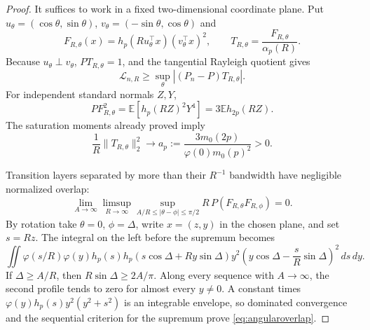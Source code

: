 \documentclass[11pt]{article}
\newcommand{\E}{\mathbb E}
\begin{document}
\begin{proof}
It suffices to work in a fixed two-dimensional coordinate plane.  Put
$u_\theta=(\cos\theta,\sin\theta)$, $v_\theta=(-\sin\theta,\cos\theta)$ and
\[
 F_{R,\theta}(x)=h_p(Ru_\theta^\top x)(v_\theta^\top x)^2,
 \qquad T_{R,\theta}=\frac{F_{R,\theta}}{\alpha_p(R)}.
\]
Because $u_\theta\perp v_\theta$, $PT_{R,\theta}=1$, and the tangential Rayleigh quotient gives
\begin{equation}
 \mathcal L_{n,R}\ge\sup_\theta|(P_n-P)T_{R,\theta}|.
 \label{eq:tangentialprocesslower}
\end{equation}
For independent standard normals $Z,Y$,
\[
 PF_{R,\theta}^2=\E[h_p(RZ)^2Y^4]=3\E h_{2p}(RZ).
\]
The saturation moments already proved imply
\begin{equation}
 \frac1R\lVert T_{R,\theta}\rVert_2^2\longrightarrow
 a_p:=\frac{3m_0(2p)}{\varphi(0)m_0(p)^2}>0.
 \label{eq:angularprocessvariance}
\end{equation}

Transition layers separated by more than their $R^{-1}$ bandwidth have negligible normalized overlap:
\begin{equation}
 \lim_{A\to\infty}\limsup_{R\to\infty}
 \sup_{A/R\le|\theta-\phi|\le\pi/2}R\,P(F_{R,\theta}F_{R,\phi})=0.
 \label{eq:angularoverlap}
\end{equation}
By rotation take $\theta=0$, $\phi=\Delta$, write $x=(z,y)$ in the chosen plane, and set $s=Rz$.  The integral
on the left before the supremum becomes
\[
 \iint\varphi(s/R)\varphi(y)h_p(s)h_p(s\cos\Delta+Ry\sin\Delta)y^2
 \left(y\cos\Delta-\frac{s}{R}\sin\Delta\right)^2\,ds\,dy.
\]
If $\Delta\ge A/R$, then $R\sin\Delta\ge2A/\pi$.  Along every sequence with $A\to\infty$, the second profile
tends to zero for almost every $y\ne0$.  A constant times
$\varphi(y)h_p(s)y^2(y^2+s^2)$ is an integrable envelope, so dominated convergence and the sequential criterion
for the supremum prove \eqref{eq:angularoverlap}.


\end{proof}
\end{document}

